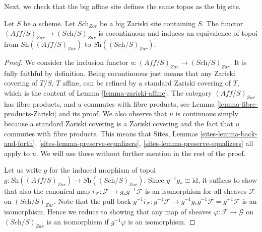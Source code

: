 \noindent
Next, we check that the big affine site defines the same
topos as the big site.

\begin{lemma}
\label{lemma-affine-big-site-Zariski}
Let $S$ be a scheme. Let $\textit{Sch}_{Zar}$ be a big Zariski
site containing $S$.
The functor $(\textit{Aff}/S)_{Zar} \to (\textit{Sch}/S)_{Zar}$
is cocontinuous and induces an equivalence of topoi from
$\textit{Sh}((\textit{Aff}/S)_{Zar})$ to
$\textit{Sh}((\textit{Sch}/S)_{Zar})$.
\end{lemma}

\begin{proof}
We consider the inclusion functor
$u : (\textit{Aff}/S)_{Zar} \to (\textit{Sch}/S)_{Zar}$.
It is fully faithful by definition. Being cocontinuous
just means that any Zariski covering of $T/S$, $T$ affine,
can be refined by a standard Zariski covering of $T$, which
is the content of Lemma \ref{lemma-zariski-affine}.
The category $(\textit{Aff}/S)_{Zar}$ has fibre products, and $u$ commutes
with fibre products, see Lemma \ref{lemma-fibre-products-Zariski}
and its proof.
We also observe that $u$ is continuous
simply because a standard Zariski covering is a Zariski covering
and the fact that $u$ commutes with fibre products.
This means that
Sites, Lemmas \ref{sites-lemma-back-and-forth},
\ref{sites-lemma-preserve-equalizers},
\ref{sites-lemma-preserve-equalizers} all apply to $u$.
We will use these without further mention in the rest of the proof.

\medskip\noindent
Let us write $g$ for the induced morphism of topoi
$g : \textit{Sh}((\textit{Aff}/S)_{Zar}) \to
\textit{Sh}((\textit{Sch}/S)_{Zar})$.
Since $g^{-1}g_* \cong \text{id}$, it suffices to show that
also the canonical map
$i_{\mathcal{F}} : \mathcal{F} \to g_* g^{-1} \mathcal{F}$
is an isomorphism for all sheaves $\mathcal{F}$ on
$(\textit{Sch}/S)_{Zar}$. Note that the pull back
$g^{-1}i_{\mathcal{F}} : g^{-1} \mathcal{F} \to
g^{-1} g_* g^{-1} \mathcal{F} = g^{-1} \mathcal{F}$
is an isomorphism. Hence we reduce to showing that any
map of sheaves $\varphi : \mathcal{F} \to \mathcal{G}$ on
$(\textit{Sch}/S)_{Zar}$ is an isomorphism if $g^{-1}\varphi$
is an isomorphism.


\end{proof}
